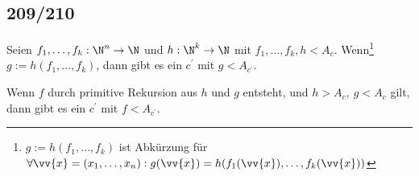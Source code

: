 \subsection*{209/210}

\begin{exercise}[209]

Seien $f_1,\dots,f_k: \N^n \to \N$ und $h: \N^k \to \N$ mit $f_1,\dots,f_k, h < A_c$.
Wenn\footnote{$g := h(f_1,\dots,f_k)$ ist Abkürzung für $\forall \vv{x} = (x_1,\dots,x_n):
g(\vv{x}) = h(f_1(\vv{x}),\dots,f_k(\vv{x}))$} $g := h(f_1,\dots,f_k)$, dann gibt
es ein $c^{\prime}$ mit $g < A_{c^{\prime}}$.

\end{exercise}


\begin{solution}

\phantom{}

\end{solution}

\begin{exercise}[210]

Wenn $f$ durch primitive Rekursion aus $h$ und $g$ entsteht, und $h > A_c,\ g < A_c$
gilt, dann gibt es ein $c^{\prime}$ mit $f < A_{c^{\prime}}$.

\end{exercise}


\begin{solution}

\phantom{}

\end{solution}
